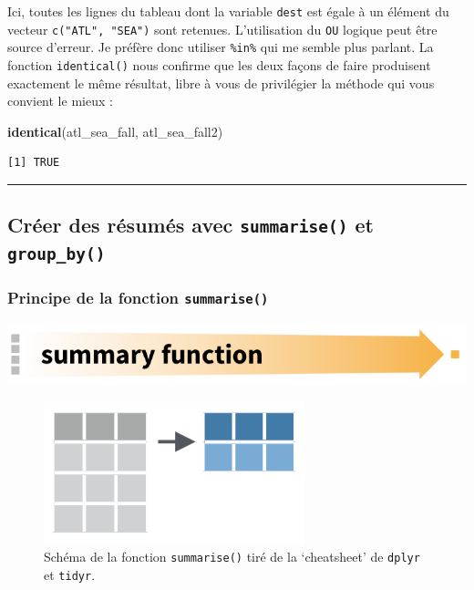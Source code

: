 \documentclass[a4paperpaper,]{article}
\newenvironment{Shaded}{\begin{snugshade}}{\end{snugshade}}
\newcommand{\KeywordTok}[1]{\textcolor[rgb]{0.12,0.11,0.11}{\textbf{#1}}}
\newcommand{\NormalTok}[1]{\textcolor[rgb]{0.12,0.11,0.11}{#1}}
\begin{document}
Ici, toutes les lignes du tableau dont la variable \texttt{dest} est égale à un élément du vecteur \texttt{c("ATL",\ "SEA")} sont retenues. L'utilisation du \texttt{OU} logique peut être source d'erreur. Je préfère donc utiliser \texttt{\%in\%} qui me semble plus parlant. La fonction \texttt{identical()} nous confirme que les deux façons de faire produisent exactement le même résultat, libre à vous de privilégier la méthode qui vous convient le mieux :

\begin{Shaded}
\begin{Highlighting}[]
\KeywordTok{identical}\NormalTok{(atl_sea_fall, atl_sea_fall2)}
\end{Highlighting}
\end{Shaded}

\begin{verbatim}
[1] TRUE
\end{verbatim}

\begin{center}\rule{0.5\linewidth}{\linethickness}\end{center}

\hypertarget{creer-des-resumes-avec-summarise-et-group_by}{%
\subsection{\texorpdfstring{Créer des résumés avec \texttt{summarise()} et \texttt{group\_by()}}{Créer des résumés avec summarise() et group\_by()}}\label{creer-des-resumes-avec-summarise-et-group_by}}

\hypertarget{principe-de-la-fonction-summarise}{%
\subsubsection{\texorpdfstring{Principe de la fonction \texttt{summarise()}}{Principe de la fonction summarise()}}\label{principe-de-la-fonction-summarise}}

\begin{center}\includegraphics[width=0.7\linewidth]{images/summarizearrow} \end{center}

\begin{figure}[htpb]

{\centering \includegraphics[width=0.4\linewidth]{images/summarize} 

}

\caption{Schéma de la fonction \texttt{summarise()} tiré de la `cheatsheet' de \texttt{dplyr} et \texttt{tidyr}.}\label{fig:summarisefig2}
\end{figure}
\end{document}
